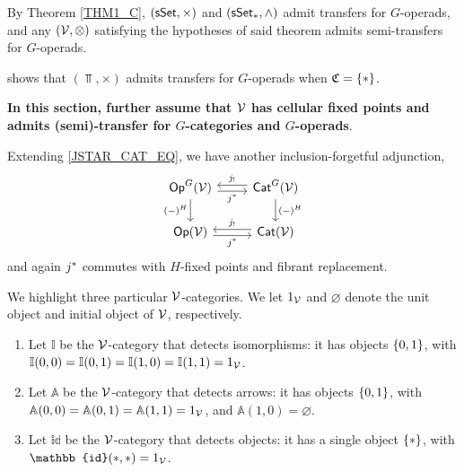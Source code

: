 \documentclass[a4paper,10pt
,draft
]{article}%
\newcommand{\I}{\mathbb I}
\renewcommand{\1}{\ensuremath{\mathbb{id}}}
\begin{document}
\begin{example}
      By Theorem \ref{THM1_C}, $(\mathsf{sSet}, \times)$ and $(\sSet_{\**}, \wedge)$ admit transfers for $G$-operads,
      and any $(\mathcal V, \otimes)$ satisfying the hypotheses of said theorem admits semi-transfers for $G$-operads.
\end{example}

\begin{example}
      \cite[Theorem 3.1]{GW17} shows that $(\Top, \times)$ admits transfers for $G$-operads when $\mathfrak C = \left\{*\right\}$.
\end{example}

\textbf{\color{OliveGreen} In this section, further assume that $\mathcal V$
  has cellular fixed points and admits (semi)-transfer for $G$-categories and $G$-operads}.

\begin{remark}
      \label{JSTAR_REM}        
      Extending \eqref{JSTAR_CAT_EQ}, we have another inclusion-forgetful adjunction,      
      \begin{equation}
            \begin{tikzcd}
                  \mathsf{Op}^G(\V) \arrow[d, "(-)^H"']
                  \arrow[r, shift right, "j^*"']
                  &
                  \mathsf{Cat}^G(\V) \arrow[l, shift right, swap, "j_!"] \arrow[d, "(-)^H"]
                  \\
                  \Op(\V) \arrow[r, shift right, "j^*"']
                  &
                  \Cat(\V) \arrow[l, shift right, swap, "j_!"]
            \end{tikzcd}
      \end{equation}
      and again $j^{\**}$ commutes with $H$-fixed points and fibrant replacement.
\end{remark}

\begin{definition}
      We highlight three particular $\mathcal V$-categories.
      We let $1_{\mathcal V}$ and $\varnothing$ denote the unit object and initial object of $\mathcal V$, respectively.
      \begin{enumerate}[label = (\roman*)]
      \item Let $\I$ be the $\mathcal V$-category that detects isomorphisms: it has objects $\left\{0,1\right\}$,
            with $\I(0,0) = \I(0,1) = \I(1,0) = \I(1,1) = 1_\V$.
      \item Let $\mathbb A$ be the $\mathcal V$-category that detects arrows: it has objects $\left\{0,1\right\}$,
            with $\mathbb A(0,0) = \mathbb A(0,1) = \mathbb A(1,1) = 1_{\mathcal V}$, and $\mathbb A(1,0) = \varnothing$.
      \item Let $\1$ be the $\mathcal V$-category that detects objects: it has a single object $\set{\**}$, with $\1(\**, \**) = 1_\V$.
      \end{enumerate}
\end{definition}
\end{document}
